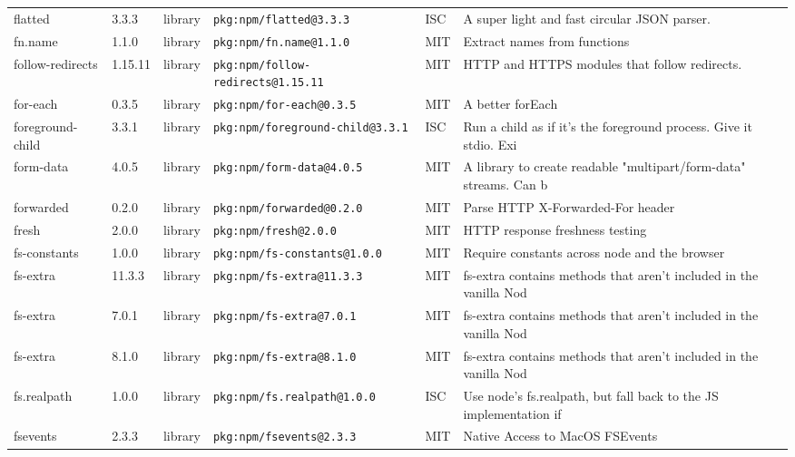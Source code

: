 \documentclass[11pt,a4paper]{article}
\begin{document}
\begin{longtable}{|p{4cm}|p{2cm}|p{1.6cm}|p{5cm}|p{1.5cm}|p{3.5cm}|}
\raggedright flatted & 3.3.3 & library & \small\texttt{pkg:npm/flatted@3.3.3} & ISC & \small A super light and fast circular JSON parser. \\
\raggedright fn.name & 1.1.0 & library & \small\texttt{pkg:npm/fn.name@1.1.0} & MIT & \small Extract names from functions \\
\raggedright follow-redirects & 1.15.11 & library & \small\texttt{pkg:npm/follow-redirects@1.15.11} & MIT & \small HTTP and HTTPS modules that follow redirects. \\
\raggedright for-each & 0.3.5 & library & \small\texttt{pkg:npm/for-each@0.3.5} & MIT & \small A better forEach \\
\raggedright foreground-child & 3.3.1 & library & \small\texttt{pkg:npm/foreground-child@3.3.1} & ISC & \small Run a child as if it's the foreground process. Give it stdio. Exi \\
\raggedright form-data & 4.0.5 & library & \small\texttt{pkg:npm/form-data@4.0.5} & MIT & \small A library to create readable "multipart/form-data" streams. Can b \\
\raggedright forwarded & 0.2.0 & library & \small\texttt{pkg:npm/forwarded@0.2.0} & MIT & \small Parse HTTP X-Forwarded-For header \\
\raggedright fresh & 2.0.0 & library & \small\texttt{pkg:npm/fresh@2.0.0} & MIT & \small HTTP response freshness testing \\
\raggedright fs-constants & 1.0.0 & library & \small\texttt{pkg:npm/fs-constants@1.0.0} & MIT & \small Require constants across node and the browser \\
\raggedright fs-extra & 11.3.3 & library & \small\texttt{pkg:npm/fs-extra@11.3.3} & MIT & \small fs-extra contains methods that aren't included in the vanilla Nod \\
\raggedright fs-extra & 7.0.1 & library & \small\texttt{pkg:npm/fs-extra@7.0.1} & MIT & \small fs-extra contains methods that aren't included in the vanilla Nod \\
\raggedright fs-extra & 8.1.0 & library & \small\texttt{pkg:npm/fs-extra@8.1.0} & MIT & \small fs-extra contains methods that aren't included in the vanilla Nod \\
\raggedright fs.realpath & 1.0.0 & library & \small\texttt{pkg:npm/fs.realpath@1.0.0} & ISC & \small Use node's fs.realpath, but fall back to the JS implementation if \\
\raggedright fsevents & 2.3.3 & library & \small\texttt{pkg:npm/fsevents@2.3.3} & MIT & \small Native Access to MacOS FSEvents \\

\end{longtable}
\end{document}
